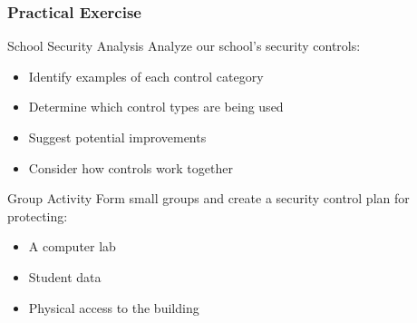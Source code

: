 \documentclass{beamer}
\begin{document}
\begin{frame}
    \frametitle{Practical Exercise}
    
    \begin{exampleblock}{School Security Analysis}
        Analyze our school's security controls:
        \begin{itemize}
            \item Identify examples of each control category
            \item Determine which control types are being used
            \item Suggest potential improvements
            \item Consider how controls work together
        \end{itemize}
    \end{exampleblock}
    
    \begin{block}{Group Activity}
        Form small groups and create a security control plan for protecting:
        \begin{itemize}
            \item A computer lab
            \item Student data
            \item Physical access to the building
        \end{itemize}
    \end{block}
\end{frame}
\end{document}
